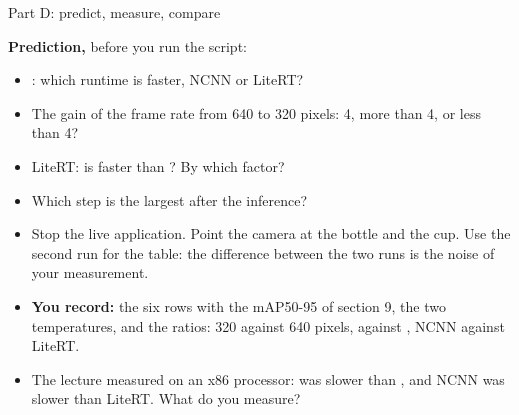 \begin{frame}{Part D: predict, measure, compare}
  \begin{exerciseblock}
    \textbf{Prediction,} before you run the script:
    \begin{itemize}
      \item {}: which runtime is faster, NCNN or LiteRT?
      \item The gain of the frame rate from 640 to 320 pixels: 4, more
            than 4, or less than 4?
      \item LiteRT: is  faster than ? By which
            factor?
      \item Which step is the largest after the inference?
    \end{itemize}
  \end{exerciseblock}
  \small
  \begin{itemize}
    \item Stop the live application. Point the camera at the bottle and
          the cup. Use the second run for the table: the difference
          between the two runs is the noise of your measurement.
    \item \textbf{You record:} the six rows with the mAP50-95 of section 9,
          the two temperatures, and the ratios: 320 against 640 pixels,
           against , NCNN against LiteRT.
    \item The lecture measured on an x86 processor:  was slower
          than , and NCNN was slower than LiteRT. What do
          you measure?
  \end{itemize}
\end{frame}
